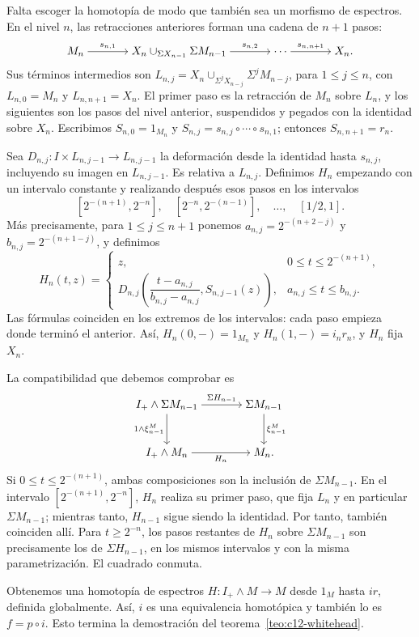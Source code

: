 Falta escoger la homotopía de modo que también sea un morfismo de espectros. En el nivel $n$, las retracciones anteriores forman una cadena de $n+1$ pasos:
\[
\begin{tikzcd}[cramped,column sep=large]
M_n \arrow[r,"s_{n,1}"]
& X_n\cup_{\Sigma X_{n-1}}\Sigma M_{n-1} \arrow[r,"s_{n,2}"]
& \cdots \arrow[r,"s_{n,n+1}"] & X_n.
\end{tikzcd}
\]
Sus términos intermedios son $L_{n,j}=X_n\cup_{\Sigma^jX_{n-j}}\Sigma^jM_{n-j}$, para $1\le j\le n$, con $L_{n,0}=M_n$ y $L_{n,n+1}=X_n$. El primer paso es la retracción de $M_n$ sobre $L_n$, y los siguientes son los pasos del nivel anterior, suspendidos y pegados con la identidad sobre $X_n$. Escribimos $S_{n,0}=1_{M_n}$ y $S_{n,j}=s_{n,j}\circ\cdots\circ s_{n,1}$; entonces $S_{n,n+1}=r_n$.

Sea $D_{n,j}\colon I\times L_{n,j-1}\to L_{n,j-1}$ la deformación desde la identidad hasta $s_{n,j}$, incluyendo su imagen en $L_{n,j-1}$. Es relativa a $L_{n,j}$. Definimos $H_n$ empezando con un intervalo constante y realizando después esos pasos en los intervalos
\[
[2^{-(n+1)},2^{-n}],\quad[2^{-n},2^{-(n-1)}],\quad\ldots,\quad[1/2,1].
\]
Más precisamente, para $1\le j\le n+1$ ponemos $a_{n,j}=2^{-(n+2-j)}$ y $b_{n,j}=2^{-(n+1-j)}$, y definimos
\[
H_n(t,z)=
\begin{cases}
z,&0\le t\le2^{-(n+1)},\\[2pt]
D_{n,j}\!\left(\dfrac{t-a_{n,j}}{b_{n,j}-a_{n,j}},S_{n,j-1}(z)\right),
&a_{n,j}\le t\le b_{n,j}.
\end{cases}
\]
Las fórmulas coinciden en los extremos de los intervalos: cada paso empieza donde terminó el anterior. Así, $H_n(0,-)=1_{M_n}$ y $H_n(1,-)=i_nr_n$, y $H_n$ fija $X_n$.

La compatibilidad que debemos comprobar es
\[
\begin{tikzcd}[cramped,column sep=large,row sep=large]
I_+\wedge\Sigma M_{n-1} \arrow[r,"\Sigma H_{n-1}"] \arrow[d,"1\wedge\xi^M_{n-1}"']
& \Sigma M_{n-1} \arrow[d,"\xi^M_{n-1}"]\\
I_+\wedge M_n \arrow[r,"H_n"'] & M_n.
\end{tikzcd}
\]
Si $0\le t\le2^{-(n+1)}$, ambas composiciones son la inclusión de $\Sigma M_{n-1}$. En el intervalo $[2^{-(n+1)},2^{-n}]$, $H_n$ realiza su primer paso, que fija $L_n$ y en particular $\Sigma M_{n-1}$; mientras tanto, $H_{n-1}$ sigue siendo la identidad. Por tanto, también coinciden allí. Para $t\ge2^{-n}$, los pasos restantes de $H_n$ sobre $\Sigma M_{n-1}$ son precisamente los de $\Sigma H_{n-1}$, en los mismos intervalos y con la misma parametrización. El cuadrado conmuta.

Obtenemos una homotopía de espectros $H\colon I_+\wedge M\to M$ desde $1_M$ hasta $ir$, definida globalmente. Así, $i$ es una equivalencia homotópica y también lo es $f=p\circ i$. Esto termina la demostración del teorema~\ref{teo:c12-whitehead}.
